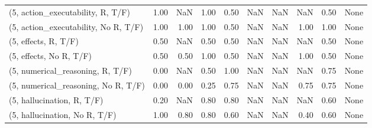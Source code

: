 \begin{table*}[h!]
\begin{adjustbox}{width=2\columnwidth,center}
\begin{tabular}{lrrr|rrr|rrr}
(5, action\_executability, R, T/F)    &                      1.00 &                   NaN &                      1.00 &                          0.50 &                       NaN &                           NaN &                                    NaN &                               0.50 &                                  None \\
(5, action\_executability, No R, T/F) &                      1.00 &                  1.00 &                      1.00 &                          0.50 &                       NaN &                           NaN &                                   1.00 &                               1.00 &                                  None \\
(5, effects, R, T/F)                 &                      0.50 &                   NaN &                      0.50 &                          0.50 &                       NaN &                           NaN &                                    NaN &                               0.50 &                                  None \\
(5, effects, No R, T/F)              &                      0.50 &                  0.50 &                      1.00 &                          0.50 &                       NaN &                           NaN &                                   1.00 &                               0.50 &                                  None \\
(5, numerical\_reasoning, R, T/F)     &                      0.00 &                   NaN &                      0.50 &                          1.00 &                       NaN &                           NaN &                                    NaN &                               0.75 &                                  None \\
(5, numerical\_reasoning, No R, T/F)  &                      0.00 &                  0.00 &                      0.25 &                          0.75 &                       NaN &                           NaN &                                   0.75 &                               0.75 &                                  None \\
(5, hallucination, R, T/F)           &                      0.20 &                   NaN &                      0.80 &                          0.80 &                       NaN &                           NaN &                                    NaN &                               0.60 &                                  None \\
(5, hallucination, No R, T/F)        &                      1.00 &                  0.80 &                      0.80 &                          0.60 &                       NaN &                           NaN &                                   0.40 &                               0.60 &                                  None \\

\end{tabular}
\end{adjustbox}
\end{table*}
